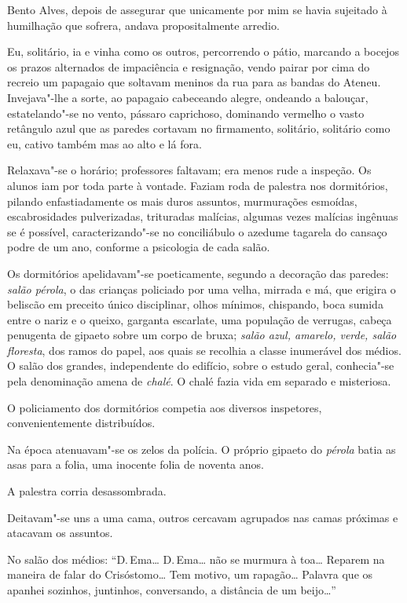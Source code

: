 Bento Alves, depois de assegurar que unicamente por mim se havia
sujeitado à humilhação que sofrera, andava propositalmente arredio. 

Eu, solitário, ia e vinha como os outros, percorrendo o pátio, marcando a
bocejos os prazos alternados de impaciência e resignação, vendo pairar
por cima do recreio um papagaio que soltavam meninos da rua para as
bandas do Ateneu. Invejava"-lhe a sorte, ao papagaio cabeceando
alegre, ondeando a balouçar, estatelando"-se no vento, pássaro
caprichoso, dominando vermelho o vasto retângulo azul que as paredes
cortavam no firmamento, solitário, solitário como eu, cativo também mas
ao alto e lá fora. 

Relaxava"-se o horário; professores faltavam; era
menos rude a inspeção. Os alunos iam por toda parte à vontade. Faziam
roda de palestra nos dormitórios, pilando enfastiadamente os mais duros
assuntos, murmurações esmoídas, escabrosidades pulverizadas, trituradas
malícias, algumas vezes malícias ingênuas se é possível, caracterizando"-se no conciliábulo o
azedume tagarela do cansaço podre de um ano, conforme a psicologia de
cada salão. 

Os dormitórios apelidavam"-se poeticamente, segundo a
decoração das paredes: \textit{salão pérola}, o das crianças policiado por uma
velha, mirrada e má, que erigira o beliscão em preceito único
disciplinar, olhos mínimos, chispando, boca sumida entre o nariz e o
queixo, garganta escarlate, uma população de verrugas, cabeça penugenta
de gipaeto sobre um corpo de bruxa; \textit{salão azul, amarelo, verde, salão
floresta}, dos ramos do papel, aos quais se recolhia a classe inumerável
dos médios. O salão dos grandes, independente do edifício, sobre o
estudo geral, conhecia"-se pela denominação amena de \textit{chalé}. O chalé
fazia vida em separado e misteriosa. 

O policiamento dos dormitórios
competia aos diversos inspetores, convenientemente distribuídos. 

Na época atenuavam"-se os zelos da polícia. O próprio gipaeto do \textit{pérola}
batia as asas para a folia, uma inocente folia de noventa anos. 

A palestra corria desassombrada. 

Deitavam"-se uns a uma cama, outros
cercavam agrupados nas camas próximas e atacavam os assuntos. 

No salão dos médios: ``D.\,Ema\ldots{} D.\,Ema\ldots{} não se murmura à toa\ldots{} Reparem na
maneira de falar do Crisóstomo\ldots{} Tem motivo, um rapagão\ldots{} Palavra que
os apanhei sozinhos, juntinhos, conversando, a distância de um beijo\ldots{}''

